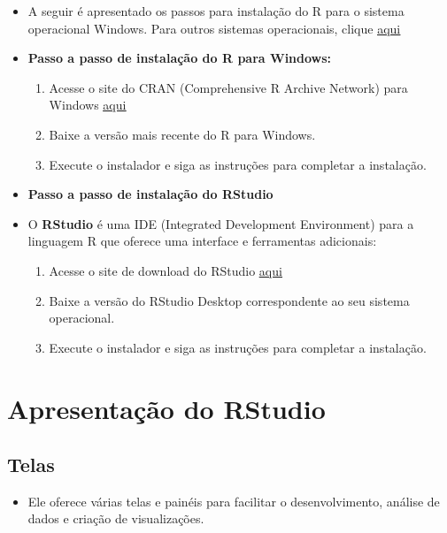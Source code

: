 \documentclass[
  letterpaper,
  DIV=11,
  numbers=noendperiod]{scrartcl}
\providecommand{\tightlist}{%
  \setlength{\itemsep}{0pt}\setlength{\parskip}{0pt}}\usepackage{longtable,booktabs,array}
\begin{document}
\begin{itemize}
\item
  A seguir é apresentado os passos para instalação do R para o sistema
  operacional Windows. Para outros sistemas operacionais, clique
  \href{https://livro.curso-r.com/1-1-instalacao-do-r.html}{\ul{aqui}}
\item
  \textbf{Passo a passo de instalação do R para Windows:}

  \begin{enumerate}
  \def\labelenumi{\arabic{enumi}.}
  \item
    Acesse o site do CRAN (Comprehensive R Archive Network) para Windows
    \href{https://cran.r-project.org/bin/windows/base/}{\ul{aqui}}
  \item
    Baixe a versão mais recente do R para Windows.
  \item
    Execute o instalador e siga as instruções para completar a
    instalação.
  \end{enumerate}
\item
  \textbf{Passo a passo de instalação do RStudio}
\item
  O \textbf{RStudio} é uma IDE (Integrated Development Environment) para
  a linguagem R que oferece uma interface e ferramentas adicionais:

  \begin{enumerate}
  \def\labelenumi{\arabic{enumi}.}
  \item
    Acesse o site de download do RStudio
    \href{https://www.rstudio.com/products/rstudio/download/}{\ul{aqui}}
  \item
    Baixe a versão do RStudio Desktop correspondente ao seu sistema
    operacional.
  \item
    Execute o instalador e siga as instruções para completar a
    instalação.
  \end{enumerate}
\end{itemize}

\section{Apresentação do RStudio}\label{apresentauxe7uxe3o-do-rstudio}

\subsection{Telas}\label{telas}

\begin{itemize}
\tightlist
\item
  Ele oferece várias telas e painéis para facilitar o desenvolvimento,
  análise de dados e criação de visualizações.
\end{itemize}
\end{document}
